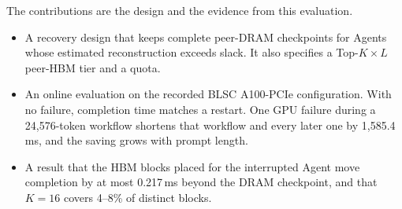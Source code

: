 The contributions are the design and the evidence from this evaluation.
\begin{itemize}
\item A recovery design that keeps complete peer-DRAM checkpoints for
Agents whose estimated reconstruction exceeds slack. It also specifies a
Top-$K{\times}L$ peer-HBM tier and a quota.
\item An online evaluation on the recorded BLSC A100-PCIe configuration.
With no failure, completion time matches a restart. One GPU failure during
a 24{,}576-token workflow shortens that workflow and every later one by
1{,}585.4\,ms, and the saving grows with prompt length.
\item A result that the HBM blocks placed for the interrupted Agent move
completion by at most 0.217\,ms beyond the DRAM checkpoint, and that
$K{=}16$ covers 4--8\% of distinct blocks.
\end{itemize}
